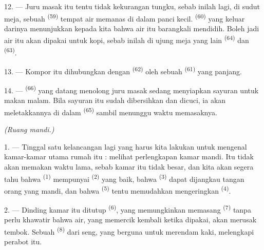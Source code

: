 12. --- Juru masak itu tentu tidak kekurangan tungku, sebab inilah
lagi, di sudut meja, sebuah  \textsuperscript{(59)}
tempat air memanas di dalam panci kecil. 
\textsuperscript{(60)} yang keluar darinya menunjukkan kepada kita
bahwa air itu barangkali mendidih. Boleh jadi air itu akan dipakai
untuk kopi, sebab inilah di ujung meja yang lain 
\textsuperscript{(64)} dan 
\textsuperscript{(63)}.

13. --- Kompor itu dihubungkan dengan 
\textsuperscript{(62)} oleh sebuah 
\textsuperscript{(61)} yang panjang.

14. ---  \textsuperscript{(66)} yang datang
menolong juru masak sedang menyiapkan sayuran untuk makan malam. Bila
sayuran itu sudah dibersihkan dan dicuci, ia akan meletakkannya di
dalam  \textsuperscript{(65)} sambil menunggu waktu
memasaknya.

\VUsaut{4.0mm}
{\centering\fontsize{10.2pt}{10.2pt}\selectfont{} \textit{(Ruang mandi.)}\par}
\VUsaut{3.0mm}

1. --- Tinggal satu kelancangan lagi yang harus kita lakukan untuk
mengenal kamar-kamar utama rumah itu : melihat perlengkapan kamar
mandi. Itu tidak akan memakan waktu lama, sebab kamar itu tidak besar,
dan kita akan segera tahu bahwa 
\textsuperscript{(1)} mempunyai 
\textsuperscript{(2)} yang baik, bahwa 
\textsuperscript{(3)} dapat dijangkau tangan orang yang mandi, dan
bahwa  \textsuperscript{(5)} tentu memudahkan
mengeringkan  \textsuperscript{(4)}.

2. --- Dinding kamar itu ditutup 
\textsuperscript{(6)}, yang memungkinkan memasang  \textsuperscript{(7)} tanpa perlu khawatir bahwa air, yang
memercik kembali ketika dipakai, akan merusak tembok. Sebuah
 \textsuperscript{(8)} dari seng, yang berguna
untuk merendam kaki, melengkapi perabot itu.

\VUsaut{6.0mm}
\VUfilet{22mm}
